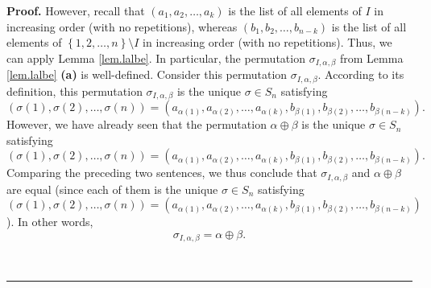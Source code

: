 \documentclass
[numbers=enddot,12pt,final,onecolumn,notitlepage,english]{scrartcl}%
\theoremstyle{definition}
\newenvironment{proof}[1][Proof]{\noindent\textbf{#1.} }{\ \rule{0.5em}{0.5em}}
\newenvironment{verlong}{}{}
\begin{document}
\begin{verlong}
\begin{proof}
However, recall that $\left(  a_{1},a_{2},\ldots,a_{k}\right)  $ is the list
of all elements of $I$ in increasing order (with no repetitions), whereas
$\left(  b_{1},b_{2},\ldots,b_{n-k}\right)  $ is the list of all elements of
$\left\{  1,2,\ldots,n\right\}  \setminus I$ in increasing order (with no
repetitions). Thus, we can apply Lemma \ref{lem.lalbe}. In particular, the
permutation $\sigma_{I,\alpha,\beta}$ from Lemma \ref{lem.lalbe} \textbf{(a)}
is well-defined. Consider this permutation $\sigma_{I,\alpha,\beta}$.
According to its definition, this permutation $\sigma_{I,\alpha,\beta}$ is the
unique $\sigma\in S_{n}$ satisfying%
\[
\left(  \sigma\left(  1\right)  ,\sigma\left(  2\right)  ,\ldots,\sigma\left(
n\right)  \right)  =\left(  a_{\alpha\left(  1\right)  },a_{\alpha\left(
2\right)  },\ldots,a_{\alpha\left(  k\right)  },b_{\beta\left(  1\right)
},b_{\beta\left(  2\right)  },\ldots,b_{\beta\left(  n-k\right)  }\right)  .
\]
However, we have already seen that the permutation $\alpha\oplus\beta$ is the
unique $\sigma\in S_{n}$ satisfying%
\[
\left(  \sigma\left(  1\right)  ,\sigma\left(  2\right)  ,\ldots,\sigma\left(
n\right)  \right)  =\left(  a_{\alpha\left(  1\right)  },a_{\alpha\left(
2\right)  },\ldots,a_{\alpha\left(  k\right)  },b_{\beta\left(  1\right)
},b_{\beta\left(  2\right)  },\ldots,b_{\beta\left(  n-k\right)  }\right)  .
\]
Comparing the preceding two sentences, we thus conclude that $\sigma
_{I,\alpha,\beta}$ and $\alpha\oplus\beta$ are equal (since each of them is
the unique $\sigma\in S_{n}$ satisfying%
\[
\left(  \sigma\left(  1\right)  ,\sigma\left(  2\right)  ,\ldots,\sigma\left(
n\right)  \right)  =\left(  a_{\alpha\left(  1\right)  },a_{\alpha\left(
2\right)  },\ldots,a_{\alpha\left(  k\right)  },b_{\beta\left(  1\right)
},b_{\beta\left(  2\right)  },\ldots,b_{\beta\left(  n-k\right)  }\right)
\]
). In other words,
\begin{equation}
\sigma_{I,\alpha,\beta}=\alpha\oplus\beta. \label{pf.lem.lalbe-k.apb=}%
\end{equation}



\end{proof}
\end{verlong}
\end{document}
